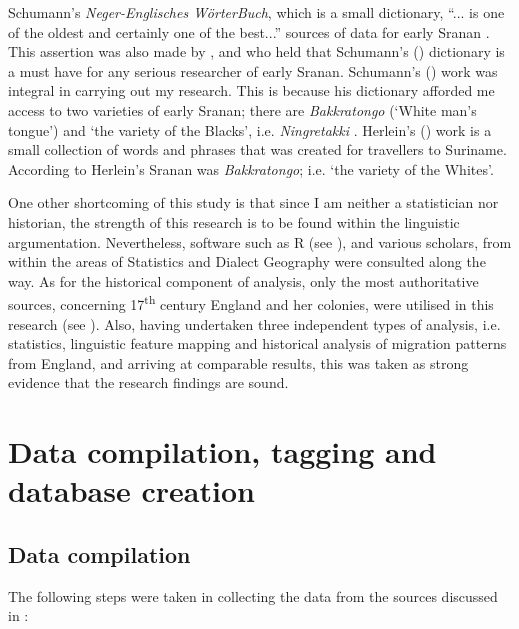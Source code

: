 Schumann's \emph{Neger-Englisches W{\"o}rterBuch}, which is a small dictionary, ``... is one of the oldest and certainly one of the best...'' sources of data for early Sranan \citep[1]{Arends89}. This assertion was also made by \citet{Kramp83}, and  \citet{Bruyn95} who held that Schumann's  (\citeyear{Schumann83}) dictionary is a must have for any serious researcher of early Sranan. Schumann's (\citeyear{Schumann83}) work was integral in carrying out my research. This is because his dictionary afforded me access to two varieties of early Sranan; there are \textit{Bakkratongo} (`White man's tongue') and `the variety of the Blacks', i.e. \textit{Ningretakki} \citep{Schumann83}. Herlein's (\citeyear{Herlein18}) work is a small collection of words and phrases that was created for travellers to Suriname. According to \citep{Arends95} Herlein's Sranan was \textit{Bakkratongo}; i.e. `the variety of the Whites'.

One other shortcoming of this study is that since I am neither a statistician nor historian, the strength of this research is to be found within the linguistic argumentation. Nevertheless, software such as R (see ), and various scholars, from within the areas of Statistics and Dialect Geography were consulted along the way. As for the historical component of analysis, only the most authoritative sources, concerning 17\textsuperscript{th} century England and her colonies, were utilised in this research (see  ). Also, having undertaken three independent types of analysis, i.e. statistics, linguistic feature mapping and historical analysis of migration patterns from England, and arriving at comparable results, this was taken as strong evidence that the research findings are sound.

\section{Data compilation, tagging and database creation} \label{3.3}
\subsection{Data compilation} \label{3.3.1}
The following steps were taken in collecting the data from the sources discussed in  :

